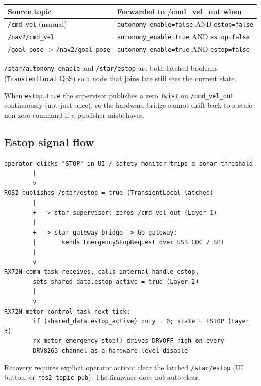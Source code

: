 \begin{center}
\begin{tabular}{|l|l|}
\hline
\textbf{Source topic}                      & \textbf{Forwarded to /cmd\_vel\_out when}                       \\
\hline
\texttt{/cmd\_vel} (manual)                & \texttt{autonomy\_enable=false} AND \texttt{estop=false}        \\
\texttt{/nav2/cmd\_vel}                    & \texttt{autonomy\_enable=true}  AND \texttt{estop=false}        \\
\texttt{/goal\_pose} -> \texttt{/nav2/goal\_pose} & \texttt{autonomy\_enable=true} AND \texttt{estop=false}    \\
\hline
\end{tabular}
\end{center}

\texttt{/star/autonomy\_enable} and \texttt{/star/estop} are both
latched booleans (\texttt{TransientLocal} QoS) so a node that joins
late still sees the current state.

When \texttt{estop=true} the supervisor publishes a zero
\texttt{Twist} on \texttt{/cmd\_vel\_out} continuously (not just
once), so the hardware bridge cannot drift back to a stale non-zero
command if a publisher misbehaves.

\subsection{Estop signal flow}

\begin{verbatim}
operator clicks "STOP" in UI / safety_monitor trips a sonar threshold
        |
        v
ROS2 publishes /star/estop = true (TransientLocal latched)
        |
        +---> star_supervisor: zeros /cmd_vel_out (Layer 1)
        |
        +---> star_gateway_bridge -> Go gateway:
        |       sends EmergencyStopRequest over USB CDC / SPI
        |
        v
RX72N comm_task receives, calls internal_handle_estop,
        sets shared_data.estop_active = true (Layer 2)
        |
        v
RX72N motor_control_task next tick:
        if (shared_data.estop_active) duty = 0; state = ESTOP (Layer 3)
        rx_motor_emergency_stop() drives DRVOFF high on every
        DRV8263 channel as a hardware-level disable
\end{verbatim}

Recovery requires explicit operator action: clear the latched
\texttt{/star/estop} (UI button, or \texttt{ros2 topic pub}). The
firmware does not auto-clear.

